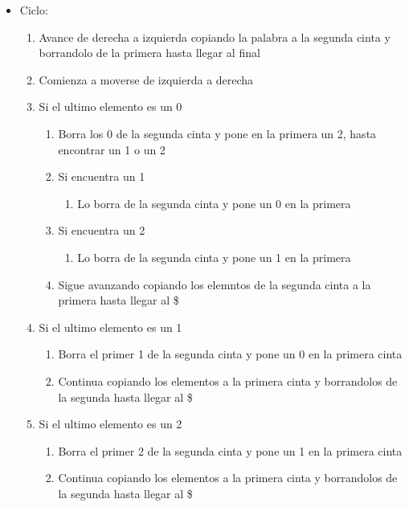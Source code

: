 \begin{itemize}
    \item Ciclo:
    \begin{enumerate}
        \item Avance de derecha a izquierda copiando la palabra a la segunda cinta y borrandolo de la primera hasta llegar al final
        \item Comienza a moverse de izquierda a derecha
        \item Si el ultimo elemento es un 0
        \begin{enumerate}
            \item Borra los 0 de la segunda cinta y pone en la primera un 2, hasta encontrar un 1 o un 2
            \item Si encuentra un 1
            \begin{enumerate}
                \item Lo borra de la segunda cinta y pone un 0 en la primera
            \end{enumerate}
            \item Si encuentra un 2
            \begin{enumerate}
                \item Lo borra de la segunda cinta y pone un 1 en la primera
            \end{enumerate}
            \item Sigue avanzando copiando los elemntos de la segunda cinta a la primera hasta llegar al \$
        \end{enumerate}
        \item Si el ultimo elemento es un 1   
        \begin{enumerate}
            \item Borra el primer 1 de la segunda cinta y pone un 0 en la primera cinta
            \item Continua copiando los elementos a la primera cinta y borrandolos de la segunda hasta llegar al \$
        \end{enumerate} 
        \item Si el ultimo elemento es un 2   
        \begin{enumerate}
            \item Borra el primer 2 de la segunda cinta y pone un 1 en la primera cinta
            \item Continua copiando los elementos a la primera cinta y borrandolos de la segunda hasta llegar al \$
        \end{enumerate} 

\end{enumerate}
\end{itemize}

